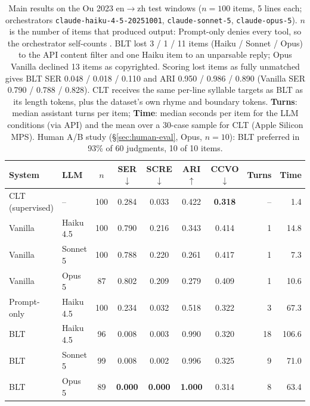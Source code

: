 \documentclass[11pt]{article}
\begin{document}
\begin{table}[t]
\centering
\small
\begin{tabular}{@{}llcccccrr@{}}
\toprule
\textbf{System} & \textbf{LLM} & $n$ & \textbf{SER} $\downarrow$ & \textbf{SCRE} $\downarrow$ & \textbf{ARI} $\uparrow$ & \textbf{CCVO} $\downarrow$ & \textbf{Turns} & \textbf{Time} \\
\midrule
CLT (supervised) & --     & 100 & 0.284 & 0.033 & 0.422 & \textbf{0.318} & -- & 1.4 \\
\midrule
Vanilla & Haiku 4.5  & 100 & 0.790 & 0.216 & 0.343 & 0.414 & 1 & 14.8 \\
Vanilla & Sonnet 5   & 100 & 0.788 & 0.220 & 0.261 & 0.417 & 1 & 7.3 \\
Vanilla & Opus 5     & 87 & 0.802 & 0.209 & 0.279 & 0.409 & 1 & 10.6 \\
\midrule
Prompt-only & Haiku 4.5 & 100 & 0.234 & 0.032 & 0.518 & 0.322 & 3 & 67.3 \\
\midrule
BLT & Haiku 4.5  & 96 & 0.008 & 0.003 & 0.990 & 0.320 & 18 & 106.6 \\
BLT & Sonnet 5   & 99 & 0.008 & 0.002 & 0.996 & 0.325 & 9 & 71.0 \\
BLT & Opus 5     & 89 & \textbf{0.000} & \textbf{0.000} & \textbf{1.000} & 0.314 & 8 & 63.4 \\
\bottomrule
\end{tabular}
\caption{Main results on the Ou 2023 en$\rightarrow$zh test windows ($n{=}100$ items, 5 lines each; orchestrators \texttt{claude-haiku-4-5-20251001}, \texttt{claude-sonnet-5}, \texttt{claude-opus-5}). $n$ is the number of items that produced output: Prompt-only denies every tool, so the orchestrator self-counts \citep{liu-etal-2026-towards}. BLT lost 3 / 1 / 11 items (Haiku / Sonnet / Opus) to the API content filter and one Haiku item to an unparsable reply; Opus Vanilla declined 13 items as copyrighted. Scoring lost items as fully unmatched gives BLT SER 0.048 / 0.018 / 0.110 and ARI 0.950 / 0.986 / 0.890 (Vanilla SER 0.790 / 0.788 / 0.828). CLT \citep{ou-etal-2023-songs} receives the same per-line syllable targets as BLT as its length tokens, plus the dataset's own rhyme and boundary tokens. \textbf{Turns}: median assistant turns per item; \textbf{Time}: median seconds per item for the LLM conditions (via API) and the mean over a 30-case sample for CLT (Apple Silicon MPS). Human A/B study (\S\ref{sec:human-eval}, Opus, $n{=}10$): BLT preferred in 93\% of 60 judgments, 10 of 10 items.}
\label{tab:orchestrator}
\end{table}
\end{document}
